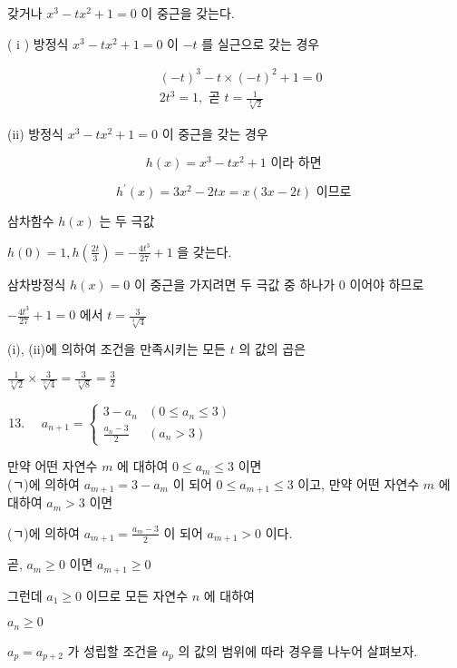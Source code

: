 \documentclass[10pt]{article}
\begin{document}
갖거나 \(x^{3}-t x^{2}+1=0\) 이 중근을 갖는다.

( i ) 방정식 \(x^{3}-t x^{2}+1=0\) 이 \(-t\) 를 실근으로 갖는 경우

\[
\begin{aligned}
& (-t)^{3}-t \times(-t)^{2}+1=0 \\
& 2 t^{3}=1, \text { 곧 } t=\frac{1}{\sqrt[3]{2}}
\end{aligned}
\]

(ii) 방정식 \(x^{3}-t x^{2}+1=0\) 이 중근을 갖는 경우

\[
h(x)=x^{3}-t x^{2}+1 \text { 이라 하면 }
\]

\[
h^{\prime}(x)=3 x^{2}-2 t x=x(3 x-2 t) \text { 이므로 }
\]

삼차함수 \(h(x)\) 는 두 극값

\(h(0)=1, h\left(\frac{2 t}{3}\right)=-\frac{4 t^{3}}{27}+1\) 을 갖는다.

삼차방정식 \(h(x)=0\) 이 중근을 가지려면 두 극값 중 하나가 0 이어야 하므로

\(-\frac{4 t^{3}}{27}+1=0\) 에서 \(t=\frac{3}{\sqrt[3]{4}}\)

(i), (ii)에 의하여 조건을 만족시키는 모든 \(t\) 의 값의 곱은

\(\frac{1}{\sqrt[3]{2}} \times \frac{3}{\sqrt[3]{4}}=\frac{3}{\sqrt[3]{8}}=\frac{3}{2}\)

\begin{enumerate}
  \setcounter{enumi}{12}
  \item \(\quad a_{n+1}= \begin{cases}3-a_{n} & \left(0 \leq a_{n} \leq 3\right) \\ \frac{a_{n}-3}{2} & \left(a_{n}>3\right)\end{cases}\)
\end{enumerate}

만약 어떤 자연수 \(m\) 에 대하여 \(0 \leq a_{m} \leq 3\) 이면\\
(ㄱ)에 의하여 \(a_{m+1}=3-a_{m}\) 이 되어 \(0 \leq a_{m+1} \leq 3\) 이고, 만약 어떤 자연수 \(m\) 에 대하여 \(a_{m}>3\) 이면

(ㄱ)에 의하여 \(a_{m+1}=\frac{a_{m}-3}{2}\) 이 되어 \(a_{m+1}>0\) 이다.

곧, \(a_{m} \geq 0\) 이면 \(a_{m+1} \geq 0\)

그런데 \(a_{1} \geq 0\) 이므로 모든 자연수 \(n\) 에 대하여

\(a_{n} \geq 0\)

\(a_{p}=a_{p+2}\) 가 성립할 조건을 \(a_{p}\) 의 값의 범위에 따라 경우를 나누어 살펴보자.
\end{document}
